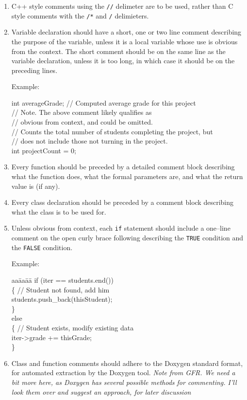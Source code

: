\documentclass[11pt]{article}
\begin{document}
\begin{enumerate}
\item C++ style comments using the {\tt //} delimeter
are to be used, rather than C style comments with the {\tt /*}
and {\tt */} delimieters.

\item Variable declaration should have a short, one or two line comment
describing the purpose of the variable, unless it is a 
local variable whose use is obvious from the context. The short
comment should be on the same line as the variable declaration, unless it
is too long, in which case it should be on the preceding lines.

Example:

\begin{tt}
int averageGrade;  // Computed average grade for this project \\
                   // Note. The above comment likely qualifies as \\
                   // obvious from context, and could be omitted.
\\
// Counts the total number of students completing the project, but\\
// does not include those not turning in the project. \\
int projectCount = 0;
\end{tt}
\item Every function should be preceded by a detailed comment block
describing what the function does, what the formal parameters are, and
what the return value is (if any).

\item Every class declaration should be preceded by a comment block
describing what the class is to be used for.

\item Unless obvious from context, each {\tt if} statement should 
include a one--line comment on the open curly brace following describing
the {\tt TRUE} condition and the {\tt FALSE} condition.

Example:

\begin{tt}
\begin{tabbing}
aa\=aa\=aa\= \kill
if (iter == students.end()) \\
\>\{ // Student not found, add him \\
\>\>students.push\_back(thisStudent); \\
\>\} \\
else \\
\>\{ // Student exists, modify existing data \\
\>\>iter->grade += thisGrade; \\
\>\}
\end{tabbing}
\end{tt}
\item Class and function comments should adhere to the Doxygen standard
format, for automated extraction by the Doxygen tool.  {\em Note from
GFR. We need a bit more here, as Doxygen has several possible methods
for commenting.  I'll look them over and suggest an approach, for later
discussion}

\end{enumerate}
\end{document}
